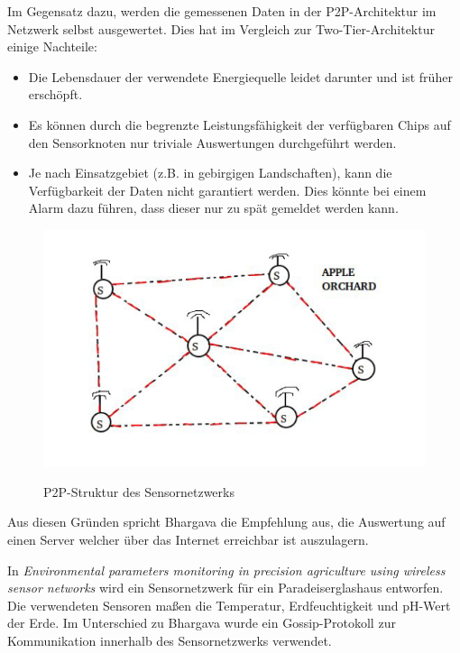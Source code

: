 Im Gegensatz dazu, werden die gemessenen Daten in der P2P-Architektur im Netzwerk selbst ausgewertet. Dies hat im Vergleich zur Two-Tier-Architektur einige Nachteile:
\begin{itemize}
	\item Die Lebensdauer der verwendete Energiequelle leidet darunter und ist früher erschöpft.
	\item Es können durch die begrenzte Leistungsfähigkeit der verfügbaren Chips auf den Sensorknoten nur triviale Auswertungen durchgeführt werden.
	\item Je nach Einsatzgebiet (z.B. in gebirgigen Landschaften), kann die Verfügbarkeit der Daten nicht garantiert werden. Dies könnte bei einem Alarm dazu führen, dass dieser nur zu spät gemeldet werden kann.
\end{itemize}

\begin{figure}[h]
 \includegraphics[scale=0.5,natwidth=\textwidth]{figures/sensors/p2p_architecture.png}
 \centering
 \label{fig:fmishierarchy}
 \caption{P2P-Struktur des Sensornetzwerks \cite{jour:Bhargava2014}}
\end{figure}

Aus diesen Gründen spricht Bhargava die Empfehlung aus, die Auswertung auf einen Server welcher über das Internet erreichbar ist auszulagern.\cite{jour:Bhargava2014}

In \textit{Environmental parameters monitoring in precision agriculture using wireless sensor
networks} wird ein Sensornetzwerk für ein Paradeiserglashaus entworfen. Die verwendeten Sensoren maßen die Temperatur, Erdfeuchtigkeit und pH-Wert der Erde. Im Unterschied zu Bhargava wurde ein Gossip-Protokoll zur Kommunikation innerhalb des Sensornetzwerks verwendet.\cite{jour:Srbinovska2014}

